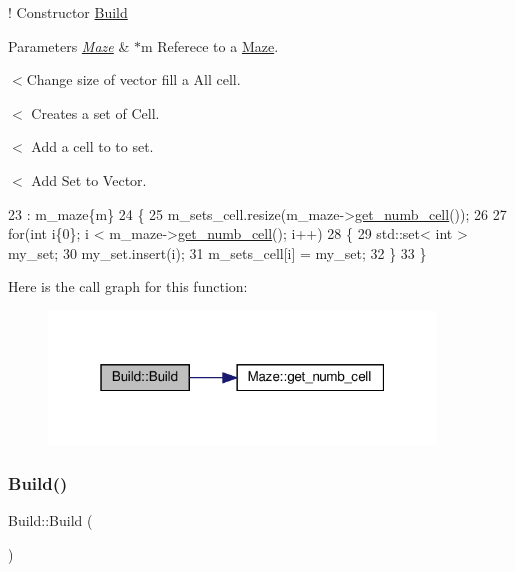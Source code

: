 ! Constructor \hyperlink{classBuild}{Build} 


\begin{DoxyParams}{Parameters}
{\em \hyperlink{classMaze}{Maze}} & $\ast$m Referece to a \hyperlink{classMaze}{Maze}. \\
\hline
\end{DoxyParams}
$<$Change size of vector fill a All cell.

$<$ Creates a set of Cell.

$<$ Add a cell to to set.

$<$ Add Set to Vector. 
\begin{DoxyCode}
23                         : m\_maze\{m\}
24         \{
25             m\_sets\_cell.resize(m\_maze->\hyperlink{classMaze_a90f5c1c140a9991942204d4a7fec3bf8}{get\_numb\_cell}());        
26 
27             \textcolor{keywordflow}{for}(\textcolor{keywordtype}{int} i\{0\}; i < m\_maze->\hyperlink{classMaze_a90f5c1c140a9991942204d4a7fec3bf8}{get\_numb\_cell}(); i++)
28             \{
29                 std::set< int > my\_set;     
30                 my\_set.insert(i);           
31                 m\_sets\_cell[i] = my\_set;    
32             \}
33         \}
\end{DoxyCode}
Here is the call graph for this function\+:\nopagebreak
\begin{figure}[H]
\begin{center}
\leavevmode
\includegraphics[width=292pt]{classBuild_a1b8365d07d8ab0c0d107fbc30ee6eb1c_cgraph}
\end{center}
\end{figure}
\mbox{\label{classBuild_a96ad56fb129cfbc2131fd094c41ae1ec}} 
\subsubsection{\texorpdfstring{Build()}{Build()}\hspace{0.1cm}{\footnotesize\ttfamily [2/3]}}
{\footnotesize\ttfamily Build\+::\+Build (\begin{DoxyParamCaption}{ }\end{DoxyParamCaption})\hspace{0.3cm}{\ttfamily [inline]}}



